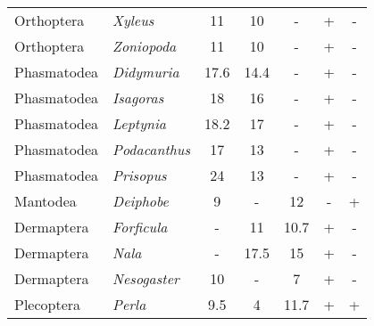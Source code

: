 \begin{table}
\begin{tabular}{llccccc}
Orthoptera             & \textit{Xyleus}                 & 11                          	& 10                          & -                           & +                 & -                 \\
Orthoptera             & \textit{Zoniopoda}              & 11                          	& 10                          & -                           & +                 & -                 \\
Phasmatodea            & \textit{Didymuria}              & 17.6                        	& 14.4                        & -                           & +                 & -                 \\
Phasmatodea            & \textit{Isagoras}               & 18                          	& 16                          & -                           & +                 & -                 \\
Phasmatodea            & \textit{Leptynia}               & 18.2                        	& 17                          & -                           & +                 & -                 \\
Phasmatodea            & \textit{Podacanthus}            & 17                          	& 13                          & -                           & +                 & -                 \\
Phasmatodea            & \textit{Prisopus}               & 24                          	& 13                          & -                           & +                 & -                 \\
Mantodea               & \textit{Deiphobe}               & 9                          	& -                           & 12                          & -                 & +                 \\
Dermaptera             & \textit{Forficula}              & -                           	& 11                          & 10.7                        & +                 & -                 \\
Dermaptera             & \textit{Nala}                   & -                           	& 17.5                        & 15                          & +                 & -                 \\
Dermaptera             & \textit{Nesogaster}             & 10                          	& -                           & 7                           & +                 & -                 \\
Plecoptera             & \textit{Perla}                  & 9.5                        	& 4                           & 11.7                        & +                 & +                 \\ \hline

\end{tabular}
\end{table}

